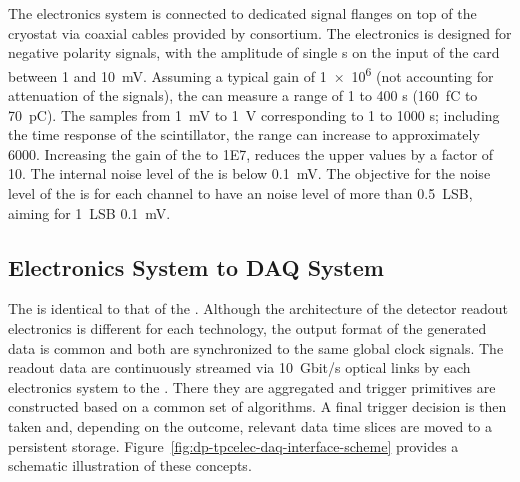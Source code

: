 The  electronics system is connected to dedicated 
 signal \fdth flanges on top of the cryostat via coaxial cables provided by %
 consortium. 
The  electronics is designed for negative polarity  signals, with the amplitude of single \phel{}s on the input of the card between \num{1} and \SI{10}{\milli\volt}. Assuming a typical  gain of \num{1e6} (not accounting for attenuation of the signals), the   can measure a range of \num{1} to \num{400} \phel{}s (\SI{160}{\femto\coulomb} to \SI{70}{\pico\coulomb}). The  samples from \SI{1}{\milli\volt} to \SI{1}{\volt} corresponding to \num{1} to \num{1000} \phel{}s; including the time response of the scintillator, the range can increase to approximately \num{6000}. Increasing the gain of the  to \num{1E7}, reduces the upper values by a factor of 10. The internal noise level of the  is below \SI{0.1}{\milli\volt}. The objective for the noise level of the  is for each channel to have an \rms noise level of more than \SI{0.5}{LSB}, aiming for \SI{1}{LSB} \SI{0.1}{\milli\volt}.


\subsection{Electronics System to DAQ System}
\label{ssec:dp-tpcelec-intfc-daq}

The   is identical to that of the . Although the architecture of the detector readout electronics is different for each technology, %
the output format of the generated data is common and both are synchronized to the same global clock signals. The readout data are continuously streamed via \SI{10}{Gbit/s} optical links 
by each   electronics system to the .  There they are aggregated and trigger primitives are constructed based on a common set of algorithms. A final trigger decision is then taken and, depending on the outcome, relevant data time slices are moved to a persistent storage. Figure~\ref{fig:dp-tpcelec-daq-interface-scheme} provides a schematic illustration of these concepts.
  
